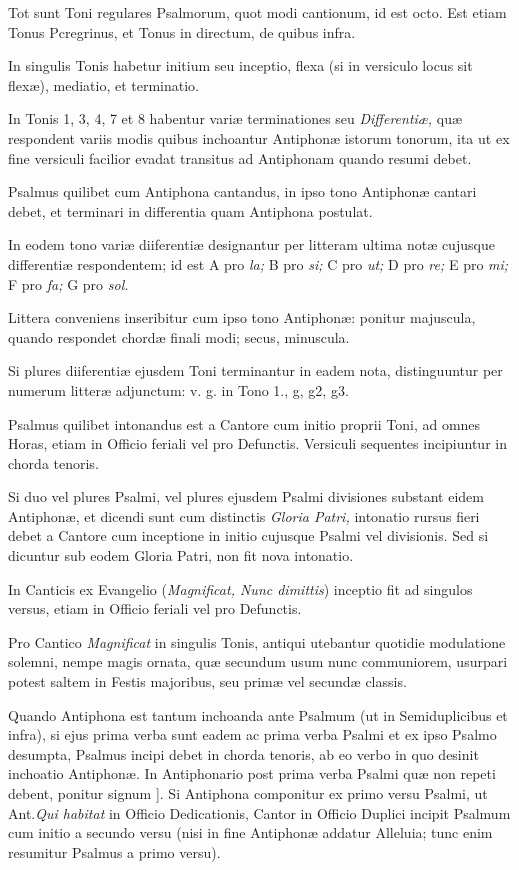 \documentclass[vesperale_romanum.tex]{subfiles}
\begin{document}
Tot sunt Toni regulares Psalmorum, quot modi cantionum, id est octo. Est etiam Tonus Pcregrinus, et Tonus in directum, de quibus infra.

In singulis Tonis habetur initium seu inceptio, flexa (si in versiculo locus sit flexæ), mediatio, et terminatio.

In Tonis 1, 3, 4, 7 et 8 habentur variæ terminationes seu \textit{Differentiæ,} quæ respondent variis modis quibus inchoantur Antiphonæ istorum tonorum, ita ut ex fine versiculi facilior evadat transitus ad Antiphonam quando resumi debet.

Psalmus quilibet cum Antiphona cantandus, in i\-pso tono Antiphonæ cantari debet, et terminari in differentia quam Antiphona postulat.

In eodem tono variæ diiferentiæ designantur per litteram ultima notæ cujusque differentiæ respondentem; id est A pro \textit{la;} B pro \textit{si;}
C pro \textit{ut;} D pro \textit{re;} E pro \textit{mi;} F pro \textit{fa;} G pro \textit{sol.}

Littera conveniens inseribitur cum i\-pso tono Antiphonæ: ponitur majuscula, quando respondet chordæ finali modi; secus, minuscula.

Si plures diiferentiæ ejusdem Toni terminantur in eadem nota, distinguuntur per numerum litteræ adjunctum: v. g. in Tono 1., g, g2, g3.

Psalmus quilibet intonandus est a Cantore cum initio proprii Toni, ad omnes Horas, etiam in Officio feriali vel pro Defunctis. Versiculi sequentes incipiuntur in chorda tenoris.

Si duo vel plures Psalmi, vel plures ejusdem Psalmi divisiones substant eidem Antiphonæ, et dicendi sunt cum distinctis \textit{Gloria Patri,} intonatio rursus fieri debet a Cantore cum inceptione in initio cujusque Psalmi vel divisionis. Sed si dicuntur sub eodem Gloria Patri, non fit nova intonatio.

In Canticis ex Evangelio (\textit{Magnificat, Nunc dimittis}) inceptio fit ad singulos versus, etiam in Officio feriali vel pro Defunctis.

Pro Cantico \textit{Magnificat} in singulis Tonis, antiqui utebantur quotidie modulatione solemni, nempe magis ornata, quæ secundum usum nunc communiorem, usurpari potest saltem in Festis majoribus, seu primæ vel secundæ classis.

Quando Antiphona est tantum inchoanda ante Psalmum (ut in Semiduplicibus et infra), si ejus prima verba sunt eadem ac prima verba Psalmi et ex i\-pso Psalmo desumpta, Psalmus incipi debet in chorda tenoris, ab eo verbo in quo desinit inchoatio Antiphonæ. In Antiphonario post prima verba Psalmi quæ non repeti debent, ponitur signum ]. Si Antiphona componitur ex primo versu Psalmi, ut Ant.\@ \textit{Qui habitat }in Officio Dedicationis, Cantor in Officio Duplici incipit Psalmum cum initio a secundo versu (nisi in fine Antiphonæ addatur Alleluia; tunc enim resumitur Psalmus a primo versu).
\end{document}
